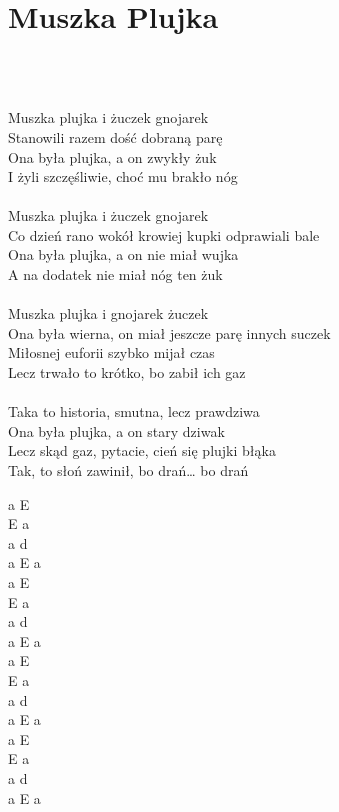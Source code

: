 \documentclass[a5paper, 10pt]{book}
\begin{document}
\section{Muszka Plujka}\textcolor{lightgray}{\textit{}}\\~\\
\begin{minipage}[t]{0.8\textwidth}
Muszka plujka i żuczek gnojarek 					\\
Stanowili razem dość dobraną parę					\\
Ona była plujka, a on zwykły żuk					\\
I żyli szczęśliwie, choć mu brakło nóg				\\
\\
Muszka plujka i żuczek gnojarek\\
Co dzień rano wokół krowiej kupki odprawiali bale\\
Ona była plujka, a on nie miał wujka\\
A na dodatek nie miał nóg ten żuk\\
\\
Muszka plujka i gnojarek żuczek\\
Ona była wierna, on miał jeszcze parę innych suczek\\
Miłosnej euforii szybko mijał czas\\
Lecz trwało to krótko, bo zabił ich gaz\\
\\
Taka to historia, smutna, lecz prawdziwa\\
Ona była plujka, a on stary dziwak\\
Lecz skąd gaz, pytacie, cień się plujki błąka\\
Tak, to słoń zawinił, bo drań… bo drań\\
\end{minipage}
\begin{minipage}[t]{0.2\textwidth}
a E \\
E a \\
a d \\
a E a\\

a E \\
E a \\
a d \\
a E a\\

a E \\
E a \\
a d \\
a E a\\

a E \\
E a \\
a d \\
a E a\\
\end{minipage}
\end{document}
